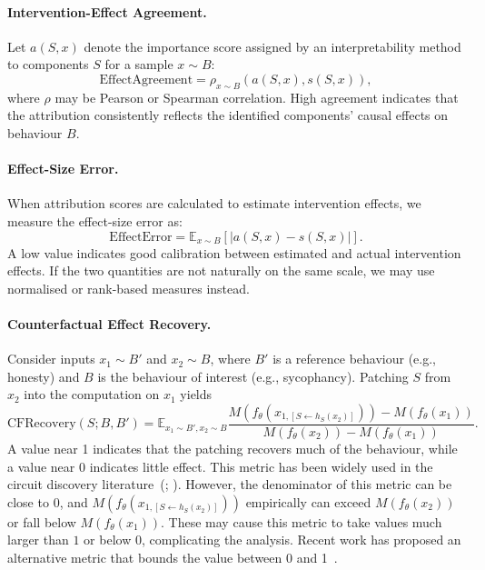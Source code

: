 \begin{definitionbox}

\paragraph{Intervention-Effect Agreement.}
Let \(a(S,x)\) denote the importance score assigned by an interpretability method to components \(S\) for a sample \(x \sim B\):
\[
\mathrm{EffectAgreement}
=
\rho_{x \sim B}\!\left(
a(S,x),
s(S,x)
\right),
\]
where \(\rho\) may be Pearson or Spearman correlation. High agreement indicates that the attribution consistently reflects the identified components’ causal effects on behaviour \(B\).\\

\paragraph{Effect-Size Error.}
When attribution scores are calculated to estimate intervention effects, we measure the effect-size error as:
\[
\mathrm{EffectError}
=
\mathbb{E}_{x \sim B}
\left[
\left|
a(S,x)-s(S,x)
\right|
\right].
\]
A low value indicates good calibration between estimated and actual intervention effects. If the two quantities are not naturally on the same scale, we may use normalised or rank-based measures instead.\\

\paragraph{Counterfactual Effect Recovery.}
Consider inputs \(x_1 \sim B'\) and \(x_2 \sim B\), where $B'$ is a reference behaviour (e.g., honesty) and $B$ is the behaviour of interest (e.g., sycophancy). Patching \(S\) from \(x_2\) into the computation on \(x_1\) yields
\[
\mathrm{CFRecovery}(S;B,B')
=
\mathbb{E}_{x_1 \sim B', x_2 \sim B}
\frac{
M\!\left(
f_\theta\!\left(
x_{1,[S \leftarrow h_S(x_2)]}
\right)
\right)
-
M\!\left(f_\theta(x_1)\right)
}{
M\!\left(f_\theta(x_2)\right)
-
M\!\left(f_\theta(x_1)\right)
}.
\]
A value near 1 indicates that the patching recovers much of the behaviour, while a value near 0 indicates little effect. This metric has been widely used in the circuit discovery literature~(; ). However, the denominator of this metric can be close to $0$, and $M\!\left(
f_\theta\!\left(
x_{1,[S \leftarrow h_S(x_2)]}
\right)
\right)$ empirically can exceed $M\!\left(f_\theta(x_2)\right)$ or fall below $M\!\left(f_\theta(x_1)\right)$. These may cause this metric to take values much larger than $1$ or below $0$, complicating the analysis. Recent work has proposed an alternative metric that bounds the value between 0 and 1~.
\end{definitionbox}

